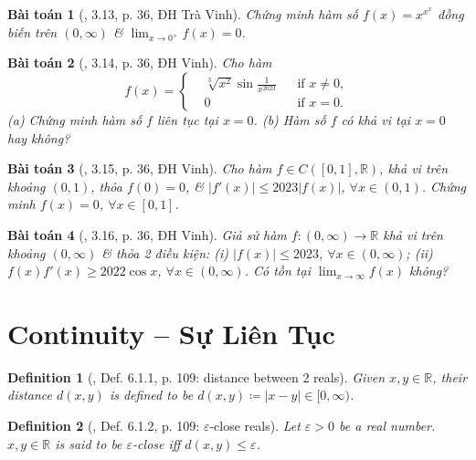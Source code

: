 \documentclass{article}
\newtheorem{baitoan}{Bài toán}
\newtheorem{definition}{Definition}
\begin{document}
\begin{baitoan}[\cite{VMS_VMC2023}, 3.13, p. 36, ĐH Trà Vinh]
	Chứng minh hàm số $f(x) = x^{x^x}$ đồng biến trên $(0,\infty)$ \& $\lim_{x\to0^+} f(x) = 0$.
\end{baitoan}

\begin{baitoan}[\cite{VMS_VMC2023}, 3.14, p. 36, ĐH Vinh]
	Cho hàm
	\begin{equation*}
		f(x) = \left\{\begin{split}
			&\sqrt[3]{x^2}\sin\frac{1}{x^{2023}}&&\mbox{if } x\ne0,\\
			&0&&\mbox{if } x = 0.
		\end{split}\right.
	\end{equation*}
	(a) Chứng minh hàm số $f$ liên tục tại $x = 0$. (b) Hàm số $f$ có khả vi tại $x = 0$ hay không?
\end{baitoan}

\begin{baitoan}[\cite{VMS_VMC2023}, 3.15, p. 36, ĐH Vinh]
	Cho hàm $f\in C([0,1],\mathbb{R})$, khả vi trên khoảng $(0,1)$, thỏa $f(0) = 0$, \& $|f'(x)|\le2023|f(x)|$, $\forall x\in(0,1)$. Chứng minh $f(x) = 0$, $\forall x\in[0,1]$.
\end{baitoan}

\begin{baitoan}[\cite{VMS_VMC2023}, 3.16, p. 36, ĐH Vinh]
	Giả sử hàm $f:(0,\infty)\to\mathbb{R}$ khả vi trên khoảng $(0,\infty)$ \& thỏa 2 điều kiện: (i) $|f(x)|\le2023$, $\forall x\in(0,\infty)$; (ii) $f(x)f'(x)\ge2022\cos x$, $\forall x\in(0,\infty)$. Có tồn tại $\lim_{x\to\infty} f(x)$ không?
\end{baitoan}


\section{Continuity -- Sự Liên Tục}

\begin{definition}[\cite{Tao_analysis_1}, Def. 6.1.1, p. 109: distance between 2 reals]
	Given $x,y\in\mathbb{R}$, their distance $d(x,y)$ is defined to be $d(x,y)\coloneqq|x - y|\in[0,\infty)$.
\end{definition}

\begin{definition}[\cite{Tao_analysis_1}, Def. 6.1.2, p. 109: $\varepsilon$-close reals]
	Let $\varepsilon > 0$ be a real number. $x,y\in\mathbb{R}$ is said to be {\rm$\varepsilon$-close} iff $d(x,y)\le\varepsilon$.
\end{definition}
\end{document}
